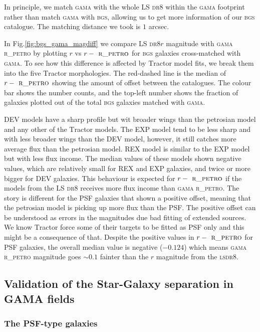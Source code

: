\documentclass[fleqn,usenatbib]{mnras}
\newcommand{\BGS}{\textsc{bgs}\xspace}
\newcommand{\DReight}{\textsc{dr8}\xspace}
\newcommand{\GAMA}{\textsc{gama}\xspace}
\newcommand{\LS}{\textsc{ls}\xspace}
\newcommand{\RPETRO}{{\textsc{ r\_petro}}\xspace}
\newcommand{\TRACTOR}{\textsc{T}ractor\xspace}
\begin{document}
In principle, we match \GAMA with the whole LS \DReight within the \GAMA footprint rather than match \GAMA with \BGS, allowing us to get more information of our \BGS catalogue. The matching distance we took is $1$ arcsec.

In Fig.\ref{fig:bgs_gama_magdiff} we compare LS \DReight $r$ magnitude with \GAMA \RPETRO by plotting $r$ vs $r-\RPETRO$ for \BGS galaxies cross-matched with \GAMA. To see how this difference is affected by \TRACTOR model fits, we break them into the five \TRACTOR morphologies. The red-dashed line is the median of $r-\RPETRO$ showing the amount of offset between the catalogues. The colour bar shows the number counts, and the top-left number shows the fraction of galaxies plotted out of the total \BGS galaxies matched with \GAMA. 

DEV models have a sharp profile but wit broader wings than the petrosian model and any other of the \TRACTOR models. The EXP model tend to be less sharp and with less broader wings than the DEV model, however, it still catches more average flux than the petrosian model. REX model is similar to the EXP model but with less flux income. The median values of these models shown negative values, which are relatively small for REX and EXP galaxies, and twice or more bigger for DEV galaxies. This behaviour is expected for $r-\RPETRO$ if the models from the LS \DReight receives more flux income than \GAMA \RPETRO. The story is different for the PSF galaxies that shown a positive offset, meaning that the petrosian model is picking up more flux than the PSF. The positive offset can be understood as errors in the magnitudes due bad fitting of extended sources. We know \TRACTOR force some of their targets to be fitted as PSF only and this might be a consequence of that. Despite the positive values in $r-\RPETRO$ for PSF galaxies, the overall median value is negative ($-0.124$) which means \GAMA \RPETRO magnitude goes $\sim 0.1$ fainter than the $r$ magnitude from the \LS \DReight. 


\subsection{Validation of the Star-Galaxy separation in GAMA fields}
\subsubsection{The PSF-type galaxies}
\end{document}
